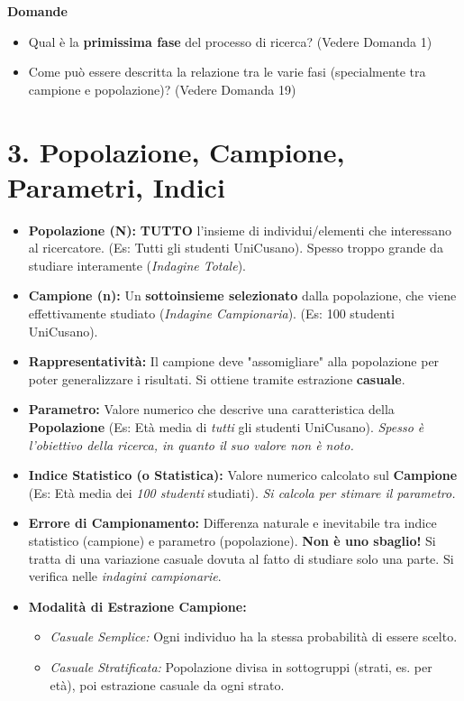\documentclass[12pt, a4paper]{article}
\newenvironment{reflectionbox}{%
    \begin{framed}\par\medskip\noindent
    \textbf{\color{boxtitlecolor}Domande} \par
    \begin{itemize}[leftmargin=*, label=$\blacktriangleright$]
}{%
    \end{itemize}\par\medskip
    \end{framed}
}
\begin{document}
\begin{reflectionbox}
    \item Qual è la \textbf{primissima fase} del processo di ricerca? (Vedere Domanda 1)
    \item Come può essere descritta la relazione tra le varie fasi (specialmente tra campione e popolazione)? (Vedere Domanda 19)
\end{reflectionbox}

\section*{3. Popolazione, Campione, Parametri, Indici}
\begin{itemize}
    \item \textbf{Popolazione (N):} \textbf{TUTTO} l'insieme di individui/elementi che interessano al ricercatore. (Es: Tutti gli studenti UniCusano). Spesso troppo grande da studiare interamente (\textit{Indagine Totale}).
    \item \textbf{Campione (n):} Un \textbf{sottoinsieme selezionato} dalla popolazione, che viene effettivamente studiato (\textit{Indagine Campionaria}). (Es: 100 studenti UniCusano).
    \item \textbf{Rappresentatività:} Il campione deve "assomigliare" alla popolazione per poter generalizzare i risultati. Si ottiene tramite estrazione \textbf{casuale}.
    \item \textbf{Parametro:} Valore numerico che descrive una caratteristica della \textbf{Popolazione} (Es: Età media di \textit{tutti} gli studenti UniCusano). \textit{Spesso è l'obiettivo della ricerca, in quanto il suo valore non è noto.}
    \item \textbf{Indice Statistico (o Statistica):} Valore numerico calcolato sul \textbf{Campione} (Es: Età media dei \textit{100 studenti} studiati). \textit{Si calcola per stimare il parametro.}
    \item \textbf{Errore di Campionamento:} Differenza naturale e inevitabile tra indice statistico (campione) e parametro (popolazione). \textbf{Non è uno sbaglio!} Si tratta di una variazione casuale dovuta al fatto di studiare solo una parte. Si verifica nelle \textit{indagini campionarie}.
    \item \textbf{Modalità di Estrazione Campione:}
        \begin{itemize}
            \item \textit{Casuale Semplice:} Ogni individuo ha la stessa probabilità di essere scelto.
            \item \textit{Casuale Stratificata:} Popolazione divisa in sottogruppi (strati, es. per età), poi estrazione casuale da ogni strato.
        \end{itemize}
\end{itemize}
\end{document}
